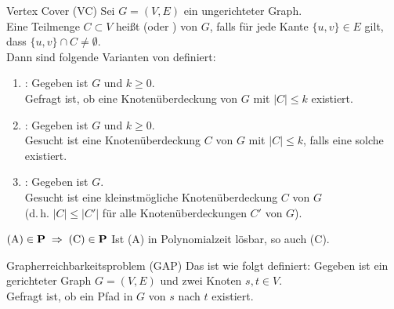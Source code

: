 \linie

\begin{Def}{Vertex Cover (VC)}
    Sei $G = (V, E)$ ein ungerichteter Graph.\\
    Eine Teilmenge $C \subset V$ heißt  (oder ) von $G$,
    falls für jede Kante $\{u, v\} \in E$ gilt, dass $\{u, v\} \cap C \not= \emptyset$.\\
    Dann sind folgende Varianten von  definiert:
    \begin{enumerate}[label=(\Alph*)]
        \item
        :
        Gegeben ist $G$ und $k \ge 0$.\\
        Gefragt ist, ob eine Knotenüberdeckung von $G$ mit $|C| \le k$ existiert.

        \item
        :
        Gegeben ist $G$ und $k \ge 0$.\\
        Gesucht ist eine Knotenüberdeckung $C$ von $G$ mit $|C| \le k$,
        falls eine solche existiert.

        \item
        :
        Gegeben ist $G$.\\
        Gesucht ist eine kleinstmögliche Knotenüberdeckung $C$ von $G$\\
        (d.\,h. $|C| \le |C'|$ für alle Knotenüberdeckungen $C'$ von $G$).
    \end{enumerate}
\end{Def}

\begin{Satz}{$\text{(A)} \in \P \;\Rightarrow\; \text{(C)} \in \P$}
    Ist (A) in Polynomialzeit lösbar, so auch (C).
\end{Satz}

\linie
\pagebreak

\begin{Def}{Grapherreichbarkeitsproblem (GAP)}
    Das  ist wie folgt definiert:
    Gegeben ist ein gerichteter Graph $G = (V, E)$ und zwei Knoten $s, t \in V$.\\
    Gefragt ist, ob ein Pfad in $G$ von $s$ nach $t$ existiert.
\end{Def}

